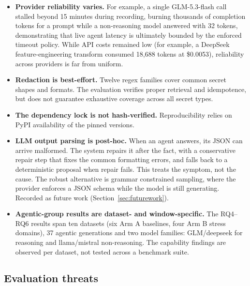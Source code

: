 \begin{itemize}
	\item \textbf{Provider reliability varies.} For example, a single GLM-5.3-flash call stalled beyond 15 minutes during recording, burning thousands of completion tokens for a prompt while a non-reasoning model answered with 32 tokens, demonstrating that live agent latency is ultimately bounded by the enforced timeout policy. While API costs remained low (for example, a DeepSeek feature-engineering transform consumed 18,688 tokens at \$0.0053), reliability across providers is far from uniform.

	\item \textbf{Redaction is best-effort.} Twelve regex families cover common secret shapes and formats. The evaluation verifies proper retrieval and idempotence, but does not guarantee exhaustive coverage across all secret types.

	\item \textbf{The dependency lock is not hash-verified.} Reproducibility relies on PyPI availability of the pinned versions.

	\item \textbf{LLM output parsing is post-hoc.} When an agent answers, its JSON can arrive malformed. The system repairs it after the fact, with a conservative repair step that fixes the common formatting errors, and falls back to a deterministic proposal when repair fails. This treats the symptom, not the cause. The robust alternative is grammar constrained sampling, where the provider enforces a JSON schema while the model is still generating. Recorded as future work (Section~\ref{sec:futurework}).

	\item \textbf{Agentic-group results are dataset- and window-specific.} The RQ4--RQ6 results span ten datasets (six Arm A baselines, four Arm B stress domains), 37 agentic generations and two model families: GLM/deepseek for reasoning and llama/mistral non-reasoning. The capability findings are observed per dataset, not tested across a benchmark suite.
\end{itemize}

\subsection{Evaluation threats}

